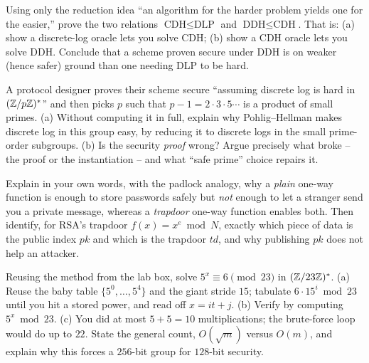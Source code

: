 \begin{exercise}
\label{ch08:ex-7}
Using only the reduction idea ``an algorithm for the harder problem yields one for the easier,'' prove the two relations $\text{CDH} \le \text{DLP}$ and $\text{DDH} \le \text{CDH}$. That is: (a) show a discrete-log oracle lets you solve CDH; (b) show a CDH oracle lets you solve DDH. Conclude that a scheme proven secure under DDH is on weaker (hence safer) ground than one needing DLP to be hard.
\end{exercise}

\begin{exercise}
\label{ch08:ex-8}
A protocol designer proves their scheme secure ``assuming discrete log is hard in $(\mathbb{Z}/p\mathbb{Z})^{*}$'' and then picks $p$ such that $p - 1 = 2 \cdot 3 \cdot 5 \cdots$ is a product of small primes. (a) Without computing it in full, explain why Pohlig--Hellman makes discrete log in this group easy, by reducing it to discrete logs in the small prime-order subgroups. (b) Is the security \emph{proof} wrong? Argue precisely what broke -- the proof or the instantiation -- and what ``safe prime'' choice repairs it.
\end{exercise}

\begin{exercise}
\label{ch08:ex-9}
Explain in your own words, with the padlock analogy, why a \emph{plain} one-way function is enough to store passwords safely but \emph{not} enough to let a stranger send you a private message, whereas a \emph{trapdoor} one-way function enables both. Then identify, for RSA's trapdoor $f(x)=x^e \bmod N$, exactly which piece of data is the public index $pk$ and which is the trapdoor $td$, and why publishing $pk$ does not help an attacker.
\end{exercise}

\begin{exercise}
\label{ch08:ex-11}
Reusing the method from the lab box, solve $5^{x}\equiv 6 \pmod{23}$ in $(\mathbb{Z}/23\mathbb{Z})^{*}$. (a) Reuse the baby table $\{5^{0},\dots,5^{4}\}$ and the giant stride $15$; tabulate $6\cdot 15^{i}\bmod 23$ until you hit a stored power, and read off $x = it + j$. (b) Verify by computing $5^{x}\bmod 23$. (c) You did at most $5+5 = 10$ multiplications; the brute-force loop would do up to $22$. State the general count, $O(\sqrt m)$ versus $O(m)$, and explain why this forces a $256$-bit group for $128$-bit security.
\end{exercise}

